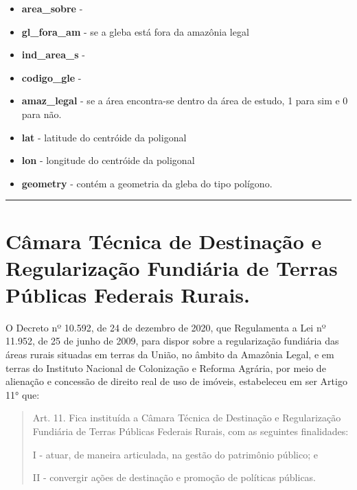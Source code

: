 \documentclass[
  letterpaper,
]{report}
\begin{document}
\begin{itemize}
\item
  \textbf{area\_sobre} -
\item
  \textbf{gl\_fora\_am} - se a gleba está fora da amazônia legal
\item
  \textbf{ind\_area\_s} -
\item
  \textbf{codigo\_gle} -
\item
  \textbf{amaz\_legal} - se a área encontra-se dentro da área de estudo,
  1 para sim e 0 para não.
\item
  \textbf{lat} - latitude do centróide da poligonal
\item
  \textbf{lon} - longitude do centróide da poligonal
\item
  \textbf{geometry} - contém a geometria da gleba do tipo polígono.
\end{itemize}

\begin{center}\rule{0.5\linewidth}{0.5pt}\end{center}


\hypertarget{cuxe2mara-tuxe9cnica-de-destinauxe7uxe3o-e-regularizauxe7uxe3o-fundiuxe1ria-de-terras-puxfablicas-federais-rurais.}{%
\chapter{Câmara Técnica de Destinação e Regularização Fundiária de
Terras Públicas Federais
Rurais.}\label{cuxe2mara-tuxe9cnica-de-destinauxe7uxe3o-e-regularizauxe7uxe3o-fundiuxe1ria-de-terras-puxfablicas-federais-rurais.}}

O Decreto nº 10.592, de 24 de dezembro de 2020, que Regulamenta a Lei nº
11.952, de 25 de junho de 2009, para dispor sobre a regularização
fundiária das áreas rurais situadas em terras da União, no âmbito da
Amazônia Legal, e em terras do Instituto Nacional de Colonização e
Reforma Agrária, por meio de alienação e concessão de direito real de
uso de imóveis, estabeleceu em ser Artigo 11° que:

\begin{quote}
Art. 11. Fica instituída a Câmara Técnica de Destinação e Regularização
Fundiária de Terras Públicas Federais Rurais, com as seguintes
finalidades:

I - atuar, de maneira articulada, na gestão do patrimônio público; e

II - convergir ações de destinação e promoção de políticas públicas.
\end{quote}
\end{document}
